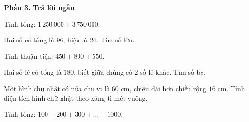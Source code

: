 \textbf{Phần 3. Trả lời ngắn}

\begin{ex} %
Tính tổng: $1\,250\,000 + 3\,750\,000$.
\end{ex}

\begin{ex} %
Hai số có tổng là $96$, hiệu là $24$. Tìm số lớn.
\end{ex}

\begin{ex} %
Tính thuận tiện: $450 + 890 + 550$.
\end{ex}

\begin{ex} %
Hai số lẻ có tổng là $180$, biết giữa chúng có $2$ số lẻ khác. Tìm số bé.
\end{ex}

\begin{ex} %
Một hình chữ nhật có nửa chu vi là $60\text{ cm}$, chiều dài hơn chiều rộng $16\text{ cm}$. Tính diện tích hình chữ nhật theo xăng-ti-mét vuông.
\end{ex}

\begin{ex} %
Tính tổng: $100 + 200 + 300 + \dots + 1000$.
\end{ex}
